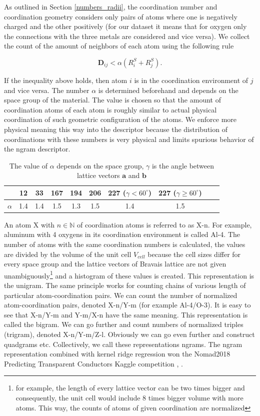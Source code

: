 \documentclass[11pt,oneside,czech,american]{book} %
\theoremstyle{plain}
\theoremstyle{definition}
\begin{document}
As outlined in Section \ref{numbers_radii}, the coordination number and coordination geometry considers only pairs of atoms where one is negatively charged and the other positively (for our dataset it means that for oxygen only the connections with the three metals are considered and vice versa). We collect the count of the amount of neighbors of each atom using the following rule

\begin{equation}
	\bm{D}_{ij} < \alpha (R^{S}_i + R^{S}_j).
	\label{decision}
\end{equation}

If the inequality above holds, then atom $i$ is in the coordination environment of $j$ and vice versa. The number $\alpha$ is determined beforehand and depends on the space group of the material. The value is chosen so that the amount of coordination atoms of each atom is roughly similar to actual physical coordination of such geometric configuration of the atoms. We enforce more physical meaning this way into the descriptor because the distribution of coordinations with these numbers is very physical and limits spurious behavior of the ngram descriptor.

\begin{table}[H]
	\centering
	\begin{tabular}{cccccccccc} 
		\hline
		&  12   &  33    & 167    & 194 & 206 & 227 ($\gamma<60^{\circ}$) & 227 ($\gamma \geq 60^{\circ}$)   \\ 
		\hline
		$\alpha$  & 1.4 & 1.4 & 1.5 & 1.3 & 1.5 & 1.4 & 1.5  \\ 
		\hline
	\end{tabular}
	\caption{The value of $\alpha$ depends on the space group, $\gamma$ is the angle between lattice vectors $\bm{a}$ and $\bm{b}$}
	\label{alpha}
\end{table}
An atom X with $n \in \mathbb{N}$ of coordination atoms is referred to as X-n. For example, aluminum with 4 oxygens in its coordination environment is called Al-4. The number of atoms with the same coordination numbers is calculated, the values are divided by the volume of the unit cell $V_{cell}$ because the cell sizes differ for every space group and the lattice vectors of Bravais lattice are not given unambiguously\footnote{for example, the length of every lattice vector can be two times bigger and consequently, the unit cell would include 8 times bigger volume with more atoms. This way, the counts of atoms of given coordination are normalized} and a histogram of these values is created. This representation is the unigram. The same principle works for counting chains of various length of particular atom-coordination pairs. We can count the number of normalized atom-coordination pairs, denoted X-n/Y-m (for example Al-4/O-3). It is easy to see that X-n/Y-m and Y-m/X-n have the same meaning. This representation is called the bigram. We can go further and count numbers of normalized triples (trigram), denoted X-n/Y-m/Z-l. Obviously we can go even further and construct quadgrams etc. Collectively, we call these representations ngrams. The ngram representation combined with kernel ridge regression won the Nomad2018 Predicting Transparent Conductors Kaggle competition \parencite{sutton18}, \parencite{sutton19}.
\end{document}
